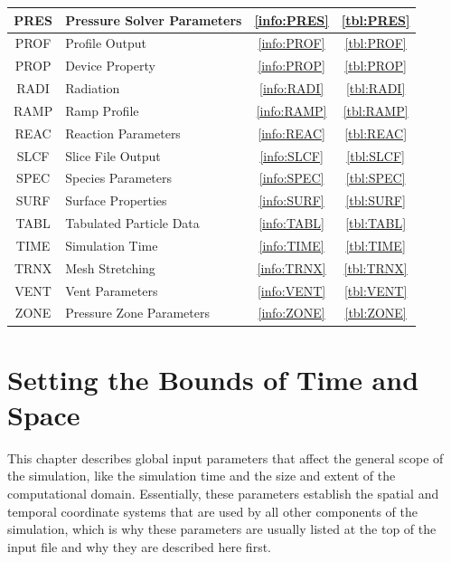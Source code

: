 \documentclass[11pt]{book}
\begin{document}
\begin{table}[ht]
\begin{center}
\begin{tabular}{|c|l|c|c|}
{\ct PRES}  & Pressure Solver Parameters   & \ref{info:PRES} & \ref{tbl:PRES}  \\ \hline
{\ct PROF}  & Profile Output               & \ref{info:PROF} & \ref{tbl:PROF}  \\ \hline
{\ct PROP}  & Device Property              & \ref{info:PROP} & \ref{tbl:PROP}  \\ \hline
{\ct RADI}  & Radiation                    & \ref{info:RADI} & \ref{tbl:RADI}  \\ \hline
{\ct RAMP}  & Ramp Profile                 & \ref{info:RAMP} & \ref{tbl:RAMP}  \\ \hline
{\ct REAC}  & Reaction Parameters          & \ref{info:REAC} & \ref{tbl:REAC}  \\ \hline
{\ct SLCF}  & Slice File Output            & \ref{info:SLCF} & \ref{tbl:SLCF}  \\ \hline
{\ct SPEC}  & Species Parameters           & \ref{info:SPEC} & \ref{tbl:SPEC}  \\ \hline
{\ct SURF}  & Surface Properties           & \ref{info:SURF} & \ref{tbl:SURF}  \\ \hline
{\ct TABL}  & Tabulated Particle Data      & \ref{info:TABL} & \ref{tbl:TABL}  \\ \hline
{\ct TIME}  & Simulation Time              & \ref{info:TIME} & \ref{tbl:TIME}  \\ \hline
{\ct TRNX}  & Mesh Stretching              & \ref{info:TRNX} & \ref{tbl:TRNX}  \\ \hline
{\ct VENT}  & Vent Parameters              & \ref{info:VENT} & \ref{tbl:VENT}  \\ \hline
{\ct ZONE}  & Pressure Zone Parameters     & \ref{info:ZONE} & \ref{tbl:ZONE}  \\ \hline
\end{tabular}
\end{center}
\end{table}


\clearpage

\chapter{Setting the Bounds of Time and Space}

This chapter describes global input parameters that affect the general scope of the simulation, like
the simulation time and the size and extent of the computational domain. Essentially, these parameters
establish the spatial and temporal coordinate systems that are used by all other components of the simulation, which is
why these parameters are usually listed at the top of the input file and why they are described here first.
\end{document}
